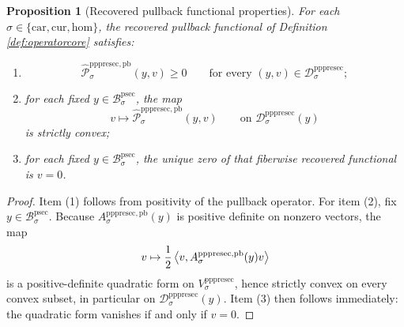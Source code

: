 \documentclass[11pt]{article}
\newcommand{\Car}{\mathrm{car}}
\newcommand{\Cur}{\mathrm{cur}}
\newcommand{\Hom}{\mathrm{hom}}
\newcommand{\ProtoSectionBody}[1]{\mathcal B_{#1}^{\mathrm{psec}}}
\newcommand{\PrePreProtoSectionVertical}[1]{V_{#1}^{\mathrm{pppresec}}}
\newcommand{\PrePreProtoSectionResidualBody}[1]{\mathcal D_{#1}^{\mathrm{pppresec}}}
\newcommand{\PrePreProtoSectionPullbackOperator}[1]{A_{#1}^{\mathrm{pppresec,pb}}}
\newcommand{\RecoveredPullbackFunctional}[1]{\widehat{\mathscr P}_{#1}^{\mathrm{pppresec,pb}}}
\newtheorem{proposition}{Proposition}
\begin{document}
\begin{proposition}[Recovered pullback functional properties]
\label{prop:functional}
For each \(\sigma\in\{\Car,\Cur,\Hom\}\), the recovered pullback functional of Definition \ref{def:operatorcore} satisfies:
\begin{enumerate}
    \item
    \[
    \RecoveredPullbackFunctional{\sigma}(y,v)\ge 0
    \qquad
    \text{for every }(y,v)\in\PrePreProtoSectionResidualBody{\sigma};
    \]
    \item for each fixed \(y\in\ProtoSectionBody{\sigma}\), the map
    \[
    v\mapsto \RecoveredPullbackFunctional{\sigma}(y,v)
    \qquad
    \text{on }
    \PrePreProtoSectionResidualBody{\sigma}(y)
    \]
    is strictly convex;
    \item for each fixed \(y\in\ProtoSectionBody{\sigma}\), the unique zero of that fiberwise recovered functional is \(v=0\).
\end{enumerate}
\end{proposition}

\begin{proof}
Item (1) follows from positivity of the pullback operator. For item (2), fix \(y\in\ProtoSectionBody{\sigma}\). Because \(\PrePreProtoSectionPullbackOperator{\sigma}(y)\) is positive definite on nonzero vectors, the map
\[
v\mapsto \frac{1}{2}\ev{v,\PrePreProtoSectionPullbackOperator{\sigma}(y)v}
\]
is a positive-definite quadratic form on \(\PrePreProtoSectionVertical{\sigma}\), hence strictly convex on every convex subset, in particular on \(\PrePreProtoSectionResidualBody{\sigma}(y)\). Item (3) then follows immediately: the quadratic form vanishes if and only if \(v=0\).
\end{proof}
\end{document}
